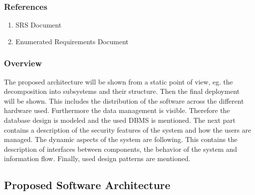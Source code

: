 		\subsubsection{References}
			\begin{enumerate}
				\item SRS Document
				\item Enumerated Requirements Document
			\end{enumerate}
		\subsubsection{Overview}
			The proposed architecture will be shown from a static point of view, eg. the decomposition into subsystems and their structure. Then the final deployment will be shown. This includes the distribution of the software across the different hardware used. Furthermore the data management is visible. Therefore the database design is modeled and the used DBMS is mentioned. The next part contains a description of the security features of the system and how the users are managed. The dynamic aspects of the system are following. This contains the description of interfaces between components, the behavior of the system and information flow. Finally, used design patterns are mentioned.

	\subsection{Proposed Software Architecture}
